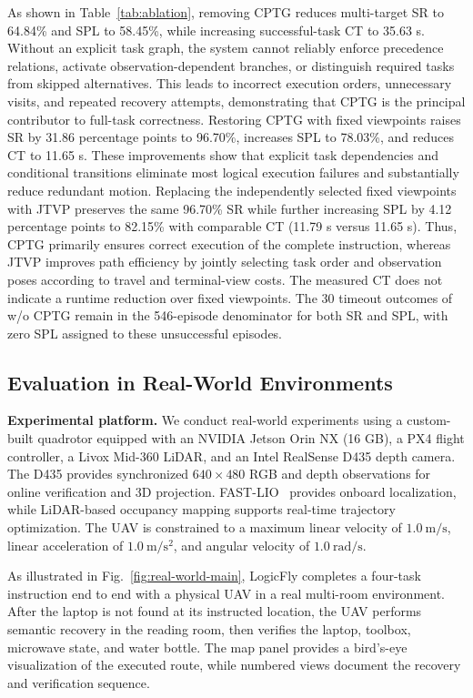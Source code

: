 \documentclass[letterpaper,10pt,journal]{IEEEtran}
\begin{document}
As shown in Table~\ref{tab:ablation}, removing CPTG reduces multi-target SR to 64.84\% and SPL to 58.45\%, while increasing successful-task CT to 35.63 s. Without an explicit task graph, the system cannot reliably enforce precedence relations, activate observation-dependent branches, or distinguish required tasks from skipped alternatives. This leads to incorrect execution orders, unnecessary visits, and repeated recovery attempts, demonstrating that CPTG is the principal contributor to full-task correctness. Restoring CPTG with fixed viewpoints raises SR by 31.86 percentage points to 96.70\%, increases SPL to 78.03\%, and reduces CT to 11.65 s. These improvements show that explicit task dependencies and conditional transitions eliminate most logical execution failures and substantially reduce redundant motion. Replacing the independently selected fixed viewpoints with JTVP preserves the same 96.70\% SR while further increasing SPL by 4.12 percentage points to 82.15\% with comparable CT (11.79 s versus 11.65 s). Thus, CPTG primarily ensures correct execution of the complete instruction, whereas JTVP improves path efficiency by jointly selecting task order and observation poses according to travel and terminal-view costs. The measured CT does not indicate a runtime reduction over fixed viewpoints. The 30 timeout outcomes of w/o CPTG remain in the 546-episode denominator for both SR and SPL, with zero SPL assigned to these unsuccessful episodes.

\subsection{Evaluation in Real-World Environments}
\textbf{Experimental platform.}
We conduct real-world experiments using a custom-built quadrotor equipped with an NVIDIA Jetson Orin NX (16 GB), a PX4 flight controller, a Livox Mid-360 LiDAR, and an Intel RealSense D435 depth camera. The D435 provides synchronized $640\times480$ RGB and depth observations for online verification and 3D projection. FAST-LIO~\cite{xu2021fastlio} provides onboard localization, while LiDAR-based occupancy mapping supports real-time trajectory optimization. The UAV is constrained to a maximum linear velocity of $1.0~\mathrm{m/s}$, linear acceleration of $1.0~\mathrm{m/s^2}$, and angular velocity of $1.0~\mathrm{rad/s}$.

As illustrated in Fig.~\ref{fig:real-world-main}, LogicFly completes a four-task instruction end to end with a physical UAV in a real multi-room environment. After the laptop is not found at its instructed location, the UAV performs semantic recovery in the reading room, then verifies the laptop, toolbox, microwave state, and water bottle. The map panel provides a bird's-eye visualization of the executed route, while numbered views document the recovery and verification sequence.
\end{document}
